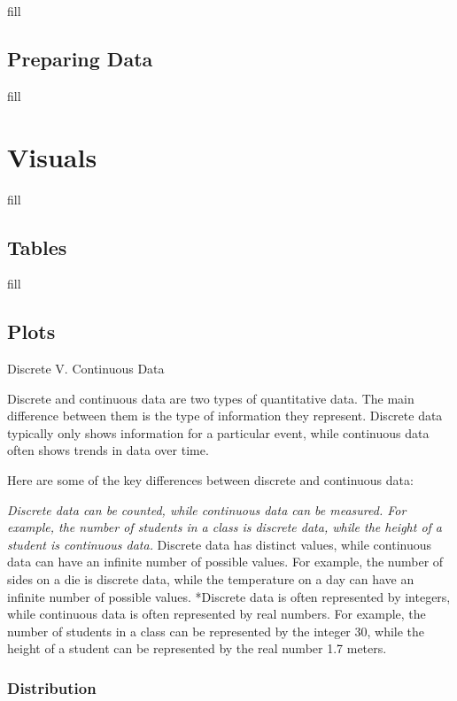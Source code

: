 \documentclass[
  b5paper]{book}
\begin{document}
fill

\hypertarget{preparing-data}{%
\section{Preparing Data}\label{preparing-data}}

fill

\hypertarget{visuals-1}{%
\chapter{Visuals}\label{visuals-1}}

fill

\hypertarget{tables}{%
\section{Tables}\label{tables}}

fill

\hypertarget{plots}{%
\section{Plots}\label{plots}}

Discrete V. Continuous Data

Discrete and continuous data are two types of quantitative data. The main difference between them is the type of information they represent. Discrete data typically only shows information for a particular event, while continuous data often shows trends in data over time.

Here are some of the key differences between discrete and continuous data:

\emph{Discrete data can be counted, while continuous data can be measured. For example, the number of students in a class is discrete data, while the height of a student is continuous data.} Discrete data has distinct values, while continuous data can have an infinite number of possible values. For example, the number of sides on a die is discrete data, while the temperature on a day can have an infinite number of possible values. *Discrete data is often represented by integers, while continuous data is often represented by real numbers. For example, the number of students in a class can be represented by the integer 30, while the height of a student can be represented by the real number 1.7 meters.

\hypertarget{distribution}{%
\subsection*{Distribution}\label{distribution}}
\end{document}
